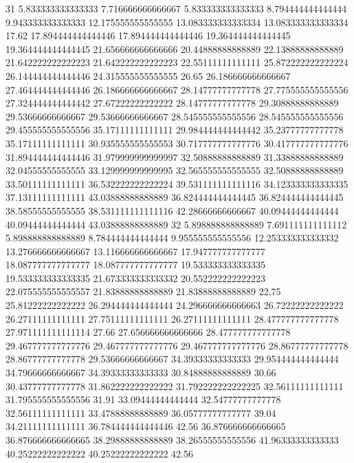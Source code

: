 31 5.833333333333333 7.716666666666667 5.833333333333333 8.794444444444444 9.943333333333333 12.175555555555555 13.083333333333334 13.083333333333334 17.62 17.894444444444446 17.894444444444446 19.364444444444445 19.364444444444445 21.656666666666666 20.44888888888889 22.13888888888889 21.642222222222223 21.642222222222223 22.55111111111111 25.872222222222224 26.144444444444446 24.315555555555555 26.65 26.186666666666667 27.464444444444446 26.186666666666667 28.14777777777778 27.775555555555556 27.324444444444442 27.67222222222222 28.14777777777778 29.30888888888889 29.53666666666667 29.53666666666667 28.545555555555556 28.545555555555556 29.455555555555556 35.17111111111111 29.984444444444442 35.23777777777778 35.17111111111111 30.935555555555553 30.717777777777776 30.417777777777776 31.894444444444446 31.979999999999997 32.50888888888889 31.33888888888889 32.04555555555555 33.129999999999995 32.565555555555555 32.50888888888889 33.50111111111111 36.532222222222224 39.531111111111116 34.123333333333335 37.13111111111111 43.03888888888889 36.824444444444445 36.824444444444445 38.58555555555555 38.531111111111116 42.28666666666667 40.09444444444444 40.09444444444444 43.03888888888889
32 5.898888888888889 7.691111111111112 5.898888888888889 8.784444444444444 9.955555555555556 12.253333333333332 13.276666666666667 13.116666666666667 17.947777777777777 18.087777777777777 18.087777777777777 19.533333333333335 19.533333333333335 21.673333333333332 20.552222222222223 22.075555555555557 21.83888888888889 21.83888888888889 22.75 25.81222222222222 26.294444444444444 24.296666666666663 26.72222222222222 26.27111111111111 27.75111111111111 26.27111111111111 28.477777777777778 27.971111111111114 27.66 27.656666666666666 28.477777777777778 29.467777777777776 29.467777777777776 29.467777777777776 28.86777777777778 28.86777777777778 29.53666666666667 34.39333333333333 29.954444444444444 34.79666666666667 34.39333333333333 30.84888888888889 30.66 30.43777777777778 31.862222222222222 31.792222222222225 32.56111111111111 31.795555555555556 31.91 33.09444444444444 32.54777777777778 32.56111111111111 33.47888888888889 36.05777777777777 39.04 34.21111111111111 36.784444444444446 42.56 36.876666666666665 36.876666666666665 38.29888888888889 38.26555555555556 41.96333333333333 40.25222222222222 40.25222222222222 42.56
